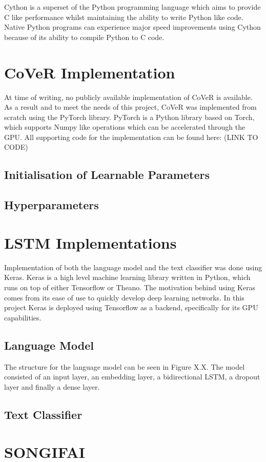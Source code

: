 \noindent
\newline
Cython is a superset of the Python programming language which aims to provide C like performance whilst maintaining the ability to write Python like code. Native Python programs can experience major speed improvements using Cython because of its ability to compile Python to C code. 

\section{CoVeR Implementation}
At time of writing, no publicly available implementation of CoVeR is available. As a result and to meet the needs of this project, CoVeR was implemented from scratch using the PyTorch library. PyTorch is a Python library based on Torch, which supports Numpy like operations which can be accelerated through the GPU. All supporting code for the implementation can be found here: (LINK TO CODE)
\subsection{Initialisation of Learnable Parameters} 
\subsection{Hyperparameters}

\section{LSTM Implementations}
Implementation of both the language model and the text classifier was done using Keras. Keras is a high level machine learning library written in Python, which runs on top of either Tensorflow or Theano. The motivation behind using Keras comes from its ease of use to quickly develop deep learning networks. In this project Keras is deployed using Tensorflow as a backend, specifically for its GPU capabilities.
\subsection{Language Model}
The structure for the language model can be seen in Figure X.X. The model consisted of an input layer, an embedding layer, a bidirectional LSTM, a dropout layer and finally a dense layer.
\subsection{Text Classifier}
\section{SONGIFAI}
